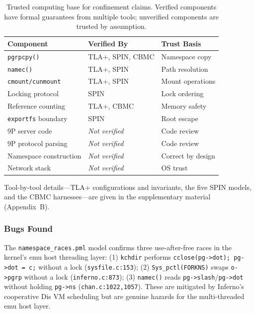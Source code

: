 \documentclass[acmsmall,screen,review]{acmart}
\begin{document}
\begin{table}[h]
\centering
\small
\begin{tabular}{p{2.2cm}p{2.8cm}p{2.5cm}}
\hline
\textbf{Component} & \textbf{Verified By} & \textbf{Trust Basis} \\
\hline
\texttt{pgrpcpy()} & TLA+, SPIN, CBMC & Namespace copy \\
\texttt{namec()} & TLA+, SPIN & Path resolution \\
\texttt{cmount/cunmount} & TLA+, SPIN & Mount operations \\
Locking protocol & SPIN & Lock ordering \\
Reference counting & TLA+, CBMC & Memory safety \\
\texttt{exportfs} boundary & SPIN & Root escape \\
\hline
9P server code & \textit{Not verified} & Code review \\
9P protocol parsing & \textit{Not verified} & Code review \\
Namespace construction & \textit{Not verified} & Correct by design \\
Network stack & \textit{Not verified} & OS trust \\
\hline
\end{tabular}
\caption{Trusted computing base for confinement claims. Verified components have
formal guarantees from multiple tools; unverified components are trusted by assumption.}
\label{tab:tcb-verification}
\end{table}

Tool-by-tool details---TLA+ configurations and invariants, the five SPIN models, and the CBMC harnesses---are given in the supplementary material (Appendix~B).

\subsubsection{Bugs Found}

The \texttt{namespace\_races.pml} model confirms three
use-after-free races in the kernel's emu host threading layer: (1) \texttt{kchdir}
performs \texttt{cclose(pg->dot); pg->dot = c;} without a lock (\texttt{sysfile.c:153});
(2) \texttt{Sys\_pctl(FORKNS)} swaps \texttt{o->pgrp} without a lock
(\texttt{inferno.c:873}); (3) \texttt{namec()} reads \texttt{pg->slash}/\texttt{pg->dot}
without holding \texttt{pg->ns} (\texttt{chan.c:1022,1057}). These are mitigated by
Inferno's cooperative Dis VM scheduling but are genuine hazards for the multi-threaded
emu host layer.
\end{document}
